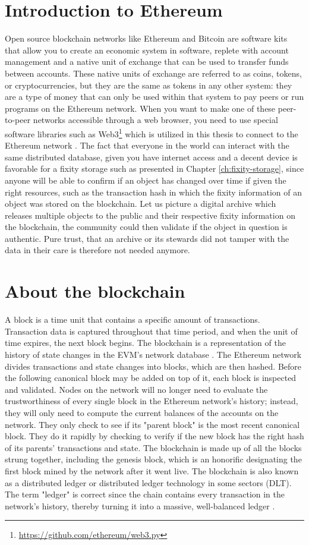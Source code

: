 \section{Introduction to Ethereum}
\label{sec:eth-blockchain}
Open source blockchain networks like Ethereum and Bitcoin are software kits that allow you to create an economic system in software, replete with account management and a native unit of exchange that can be used to transfer funds between accounts. These native units of exchange are referred to as coins, tokens, or cryptocurrencies, but they are the same as tokens in any other system: they are a type of money that can only be used within that system to pay peers or run programs on the Ethereum network.
When you want to make one of these peer-to-peer networks accessible through a web browser, you need to use special software libraries such as Web3\footnote{\url{https://github.com/ethereum/web3.py}} which is utilized in this thesis to connect to the Ethereum network \cite[2]{dannen2017introducing}.
The fact that everyone in the world can interact with the same distributed database, given you have internet access and a decent device is favorable for a fixity storage such as presented in Chapter \ref{ch:fixity-storage}, since anyone will be able to confirm if an object has changed over time if given the right resources, such as the transaction hash in which the fixity information of an object was stored on the blockchain. Let us picture a digital archive which releases multiple objects to the public and their respective fixity information on the blockchain, the community could then validate if the object in question is authentic. Pure trust, that an archive or its stewards did not tamper with the data in their care is therefore not needed anymore.
\section{About the blockchain}
A block is a time unit that contains a specific amount of transactions. Transaction data is captured throughout that time period, and when the unit of time expires, the next block begins. The blockchain is a representation of the history of state changes in the EVM's network database \cite[43]{dannen2017introducing}.
The Ethereum network divides transactions and state changes into blocks, which are then hashed. Before the following canonical block may be added on top of it, each block is inspected and validated. Nodes on the network will no longer need to evaluate the trustworthiness of every single block in the Ethereum network's history; instead, they will only need to compute the current balances of the accounts on the network. They only check to see if its "parent block" is the most recent canonical block. They do it rapidly by checking to verify if the new block has the right hash of its parents' transactions and state.
The blockchain is made up of all the blocks strung together, including the genesis block, which is an honorific designating the first block mined by the network after it went live. The blockchain is also known as a distributed ledger or distributed ledger technology in some sectors (DLT). The term "ledger" is correct since the chain contains every transaction in the network's history, thereby turning it into a massive, well-balanced ledger \cite[55]{dannen2017introducing}. 
